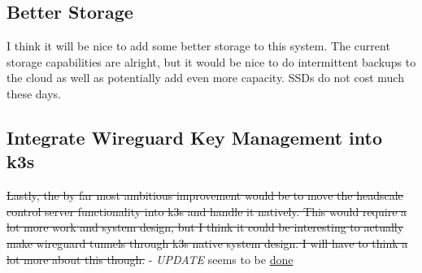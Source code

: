 \documentclass[12pt]{article}
\begin{document}
\subsection{Better Storage}
I think it will be nice to add some better storage to this system. The current storage capabilities are alright, but it would be nice to do intermittent backups to the cloud as well as potentially add even more capacity. SSDs do not cost much these days.

\subsection{Integrate Wireguard Key Management into k3s}
\sout{Lastly, the by far most ambitious improvement would be to move the headscale control server functionality into k3s and handle it natively. This would require a lot more work and system design, but I think it could be interesting to actually make wireguard tunnels through k3s native system design. I will have to think a lot more about this though.} - \emph{UPDATE} seems to be \href{https://www.netmaker.org/blog/deploy-distributed-kubernetes-clusters-with-wireguard-and-netmaker}{done}
\end{document}
